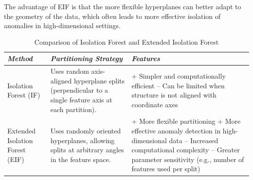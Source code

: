 The advantage of EIF is that the more flexible hyperplanes can better adapt to the geometry of the data, which often leads to more effective isolation of anomalies in high-dimensional settings.

\medskip

\begin{table}[H]
\centering
\renewcommand{\arraystretch}{1.5}
\begin{tabularx}{0.95\textwidth}{
>{\raggedright\arraybackslash}p{}
X
X
}
\toprule
\textit{Method} 
& \textit{Partitioning Strategy} 
& \textit{Features} \\
\midrule
Isolation Forest (IF) 
& Uses random axis-aligned hyperplane splits (perpendicular to a single feature axis at each partition). 
& + Simpler and computationally efficient \newline
-- Can be limited when structure is not aligned with coordinate axes \\

Extended Isolation Forest (EIF) 
& Uses randomly oriented hyperplanes, allowing splits at arbitrary angles in the feature space. 
& + More flexible partitioning \newline
+ More effective anomaly detection in high-dimensional data \newline
-- Increased computational complexity \newline
-- Greater parameter sensitivity (e.g., number of features used per split) \\
\bottomrule
\end{tabularx}
\caption*{Comparison of Isolation Forest and Extended Isolation Forest}
\end{table}

